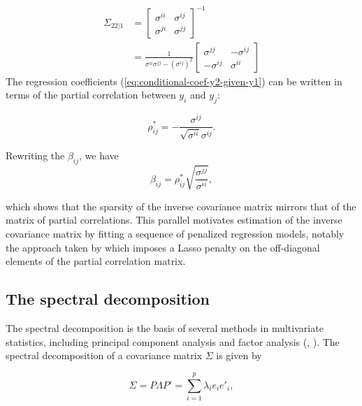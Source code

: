 \begin{align*}
\Sigma_{22 \vert 1} &= \begin{bmatrix} \sigma^{ii} & \sigma^{ij} \\ \sigma^{ji} & \sigma^{jj} \end{bmatrix}^{-1} \\
&= \frac{1}{\sigma^{ii}\sigma^{jj} - \left(\sigma^{ij}\right)^2}\begin{bmatrix} \sigma^{jj} & -\sigma^{ij} \\ -\sigma^{ij} & \sigma^{ii}\end{bmatrix}
\end{align*}
\noindent
The regression coefficients (\ref{eq:conditional-coef-y2-given-y1}) can be written in terms of the partial correlation between $y_i$ and $y_j$:

\begin{equation} \label{eq:partial-correlation-coefficient}
\rho^*_{ij} = -\frac{\sigma^{ij}}{\sqrt{\sigma^{ii}}\sigma^{ij}}.
\end{equation}

\noindent
Rewriting the $\beta_{ij}$, we have
\begin{equation} \label{eq:partial-correlation-coefficient}
\beta_{ij} = \rho^*_{ij} \sqrt{\frac{\sigma^{jj}}{\sigma^{ii}}},
\end{equation}

\noindent
which shows that the sparsity of the inverse covariance matrix mirrors that of the matrix of partial correlations. This parallel motivates estimation of the inverse covariance matrix by fitting a sequence of penalized regression models, notably the  approach taken by \cite{peng2012partial} which imposes a Lasso penalty on the off-diagonal elements of the partial correlation matrix. 


\subsection{The spectral decomposition}

The spectral decomposition is the basis of several methods in multivariate statistics, including principal component analysis and factor analysis (\citep{Anderson84a}, \citep{hotelling1933analysis}). The spectral decomposition of a covariance matrix $\Sigma$ is given by

\begin{equation} \label{eq:spectral-decomposition}
\Sigma = P \Lambda P' = \sum_{i = 1}^p \lambda_i e_i e'_i,
\end{equation}

